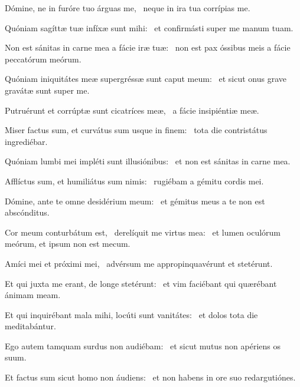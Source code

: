 \item Dómine, ne in furóre tuo árguas me,~\psstar{} neque in ira tua corrípias me.

\item Quóniam sagíttæ tuæ infíxæ sunt mihi:~\psstar{} et confirmásti super me manum tuam.

\item Non est sánitas in carne mea a fácie iræ tuæ:~\psstar{} non est pax óssibus meis a fácie peccatórum meórum.

\item Quóniam iniquitátes meæ supergréssæ sunt caput meum:~\psstar{} et sicut onus grave gravátæ sunt super me.

\item Putruérunt et corrúptæ sunt cicatríces meæ,~\psstar{} a fácie insipiéntiæ meæ.

\item Miser factus sum, et curvátus sum usque in finem:~\psstar{} tota die contristátus ingrediébar.

\item Quóniam lumbi mei impléti sunt illusiónibus:~\psstar{} et non est sánitas in carne mea.

\item Afflíctus sum, et humiliátus sum nimis:~\psstar{} rugiébam a gémitu cordis mei.

\item Dómine, ante te omne desidérium meum:~\psstar{} et gémitus meus a te non est abscónditus.

\item Cor meum conturbátum est,~\pscross{} derelíquit me virtus mea:~\psstar{} et lumen oculórum meórum, et ipsum non est mecum.

\item Amíci mei et próximi mei,~\psstar{} advérsum me appropinquavérunt et stetérunt.

\item Et qui juxta me erant, de longe stetérunt:~\psstar{} et vim faciébant qui quærébant ánimam meam.

\item Et qui inquirébant mala mihi, locúti sunt vanitátes:~\psstar{} et dolos tota die meditabántur.

\item Ego autem tamquam surdus non audiébam:~\psstar{} et sicut mutus non apériens os suum.

\item Et factus sum sicut homo non áudiens:~\psstar{} et non habens in ore suo redargutiónes.

